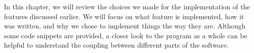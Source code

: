 In this chapter, we will review the choices we made for the implementation of the features discussed earlier. We will focus on what feature is implemented, how it was written, and why we chose to implement things the way they are. Although some code snippets are provided, a closer look to the program as a whole\cite{j-levy:bwa-gasal2} can be helpful to understand the coupling between different parts of the software.